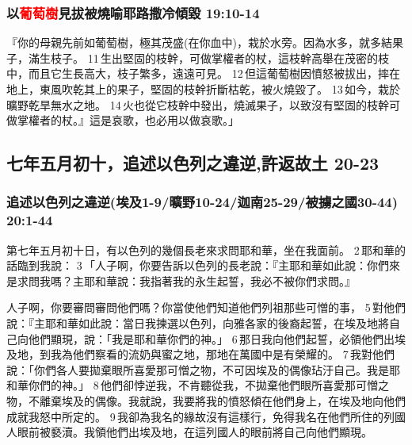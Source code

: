 \subsubsection{以\textcolor{red}{葡萄樹}見拔被燒喻耶路撒冷傾毀 19:10-14}
『你的母親先前如葡萄樹，極其茂盛(在你血中)，栽於水旁。因為水多，就多結果子，滿生枝子。 11 生出堅固的枝幹，可做掌權者的杖，這枝幹高舉在茂密的枝中，而且它生長高大，枝子繁多，遠遠可見。 12 但這葡萄樹因憤怒被拔出，摔在地上，東風吹乾其上的果子，堅固的枝幹折斷枯乾，被火燒毀了。 13 如今，栽於曠野乾旱無水之地。 14 火也從它枝幹中發出，燒滅果子，以致沒有堅固的枝幹可做掌權者的杖。』這是哀歌，也必用以做哀歌。」

\subsection{七年五月初十，追述以色列之違逆,許返故土 20-23}
\subsubsection{追述以色列之違逆(埃及1-9/曠野10-24/迦南25-29/被擄之國30-44) 20:1-44}
第七年五月初十日，有以色列的幾個長老來求問耶和華，坐在我面前。 2 耶和華的話臨到我說： 3 「人子啊，你要告訴以色列的長老說：『主耶和華如此說：你們來是求問我嗎？主耶和華說：我指著我的永生起誓，我必不被你們求問。』

人子啊，你要審問審問他們嗎？你當使他們知道他們列祖那些可憎的事， 5 對他們說：『主耶和華如此說：當日我揀選以色列，向雅各家的後裔起誓，在埃及地將自己向他們顯現，說：「我是耶和華你們的神。」 6 那日我向他們起誓，必領他們出埃及地，到我為他們察看的流奶與蜜之地，那地在萬國中是有榮耀的。 7 我對他們說：「你們各人要拋棄眼所喜愛那可憎之物，不可因埃及的偶像玷汙自己。我是耶和華你們的神。」 8 他們卻悖逆我，不肯聽從我，不拋棄他們眼所喜愛那可憎之物，不離棄埃及的偶像。我就說，我要將我的憤怒傾在他們身上，在埃及地向他們成就我怒中所定的。 9 我卻為我名的緣故沒有這樣行，免得我名在他們所住的列國人眼前被褻瀆。我領他們出埃及地，在這列國人的眼前將自己向他們顯現。

